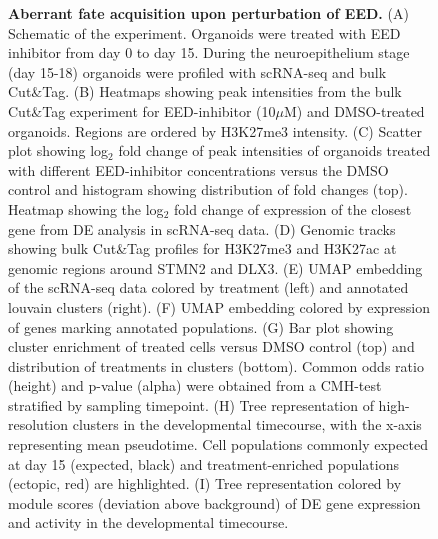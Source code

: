 \begin{figure}[t!]
    \caption{\textbf{Aberrant fate acquisition upon perturbation of EED.}
    (A) Schematic of the experiment. Organoids were treated with EED inhibitor from day 0 to day 15. During the neuroepithelium stage (day 15-18) organoids were profiled with scRNA-seq and bulk Cut\&Tag. (B) Heatmaps showing peak intensities from the bulk Cut\&Tag experiment for EED-inhibitor (10$\mu$M) and DMSO-treated organoids. Regions are ordered by H3K27me3 intensity. (C) Scatter plot showing log$_2$ fold change of peak intensities of organoids treated with different EED-inhibitor concentrations versus the DMSO control and histogram showing distribution of fold changes (top). Heatmap showing the log$_2$ fold change of expression of the closest gene from DE analysis in scRNA-seq data. (D) Genomic tracks showing bulk Cut\&Tag profiles for H3K27me3 and H3K27ac at genomic regions around STMN2 and DLX3. (E) UMAP embedding of the scRNA-seq data colored by treatment (left) and annotated louvain clusters (right). (F) UMAP embedding colored by expression of genes marking annotated populations. (G) Bar plot showing cluster enrichment of treated cells versus DMSO control (top) and distribution of treatments in clusters (bottom). Common odds ratio (height) and p-value (alpha) were obtained from a CMH-test stratified by sampling timepoint. (H) Tree representation of high-resolution clusters in the developmental timecourse, with the x-axis representing mean pseudotime. Cell populations commonly expected at day 15 (expected, black) and treatment-enriched populations (ectopic, red) are highlighted. (I) Tree representation colored by module scores (deviation above background) of DE gene expression and activity in the developmental timecourse.} 
\end{figure}


